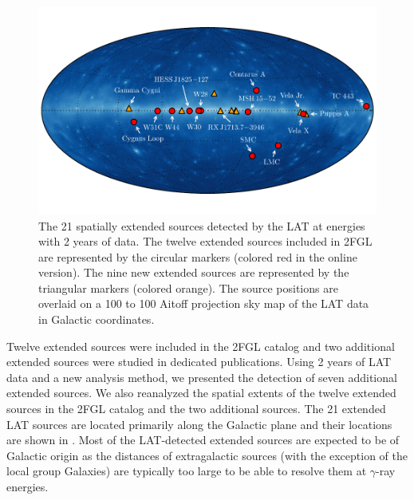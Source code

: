 \begin{figure}[htbp]
  \includegraphics{chapters/extended_search/figures/summary_plots/allsky_extended_sources_color.pdf}
  \caption{The 21 spatially extended sources detected by the LAT at \gev
  energies with 2 years of data.  The twelve extended sources included
  in 2FGL are represented by the circular markers (colored red in the
  online version).  The nine new extended sources are represented by
  the triangular markers (colored orange).  The source positions are
  overlaid on a 100 \mev to 100 \gev Aitoff projection sky map of the
  LAT data in Galactic coordinates.}
\end{figure}

Twelve extended sources were included in the 2FGL catalog and two
additional extended sources were studied in dedicated publications.
Using 2 years of LAT data and a new analysis method, we presented the
detection of seven additional extended sources.  We also reanalyzed the
spatial extents of the twelve extended sources in the 2FGL catalog and
the two additional sources.  The 21 extended LAT sources are located
primarily along the Galactic plane and their locations are shown in
.  Most of the LAT-detected extended
sources are expected to be of Galactic origin as the distances of
extragalactic sources (with the exception of the local group Galaxies) are
typically too large to be able to resolve them at $\gamma$-ray energies.


